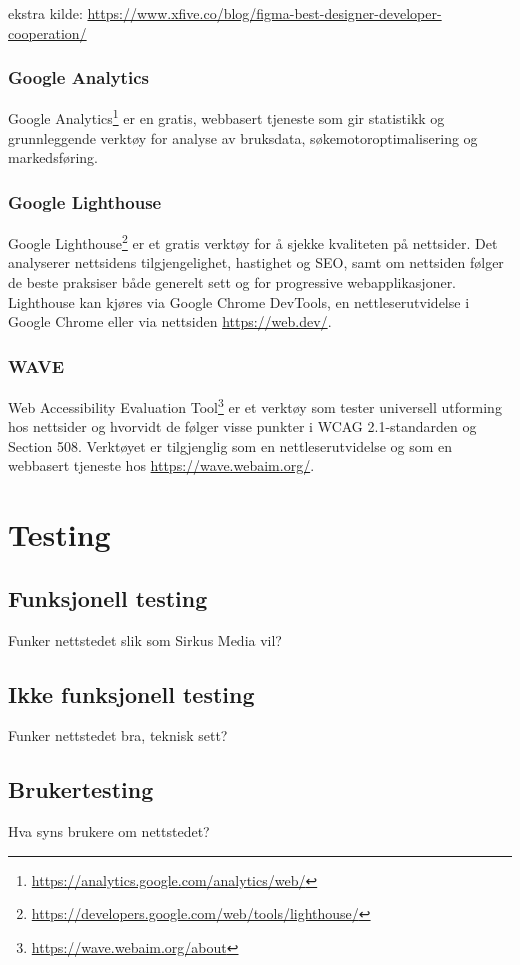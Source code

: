 ekstra kilde: \url{https://www.xfive.co/blog/figma-best-designer-developer-cooperation/}

\subsubsection{Google Analytics}
Google Analytics\footnote{\url{https://analytics.google.com/analytics/web/}} er en gratis, webbasert tjeneste som gir statistikk og grunnleggende verktøy for analyse av bruksdata, søkemotoroptimalisering og markedsføring.

\subsubsection{Google Lighthouse}
Google Lighthouse\footnote{\url{https://developers.google.com/web/tools/lighthouse/}} er et gratis verktøy for å sjekke kvaliteten på nettsider. Det analyserer nettsidens tilgjengelighet, hastighet og SEO, samt om nettsiden følger de beste praksiser både generelt sett og for progressive webapplikasjoner. Lighthouse kan kjøres via Google Chrome DevTools, en nettleserutvidelse i Google Chrome eller via nettsiden \url{https://web.dev/}.

\subsubsection{WAVE}
Web Accessibility Evaluation Tool\footnote{\url{https://wave.webaim.org/about}} er et verktøy som tester universell utforming hos nettsider og hvorvidt de følger visse punkter i WCAG 2.1-standarden og Section 508. Verktøyet er tilgjenglig som en nettleserutvidelse og som en webbasert tjeneste hos \url{https://wave.webaim.org/}.

\section{Testing}

\subsection{Funksjonell testing}
Funker nettstedet slik som Sirkus Media vil?

\subsection{Ikke funksjonell testing}
Funker nettstedet bra, teknisk sett?

\subsection{Brukertesting}
Hva syns brukere om nettstedet?







